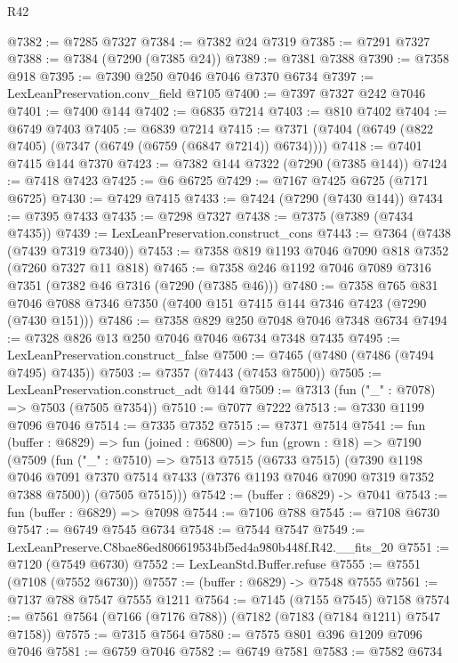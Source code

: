 \begin{lexlean}{R42}
\begin{coremodule}
{@7382 := @7285 @7327
@7384 := @7382 @24 @7319
@7385 := @7291 @7327
@7388 := @7384 (@7290 (@7385 @24))
@7389 := @7381 @7388
@7390 := @7358 @918
@7395 := @7390 @250 @7046 @7046 @7370 @6734
@7397 := LexLeanPreservation.conv_field @7105
@7400 := @7397 @7327 @242 @7046
@7401 := @7400 @144
@7402 := @6835 @7214
@7403 := @810 @7402
@7404 := @6749 @7403
@7405 := @6839 @7214
@7415 := @7371 (@7404 (@6749 (@822 @7405) (@7347 (@6749 (@6759 (@6847 @7214)) @6734))))
@7418 := @7401 @7415 @144 @7370
@7423 := @7382 @144 @7322 (@7290 (@7385 @144))
@7424 := @7418 @7423
@7425 := @6 @6725
@7429 := @7167 @7425 @6725 (@7171 @6725)
@7430 := @7429 @7415
@7433 := @7424 (@7290 (@7430 @144))
@7434 := @7395 @7433
@7435 := @7298 @7327
@7438 := @7375 (@7389 (@7434 @7435))
@7439 := LexLeanPreservation.construct_cons
@7443 := @7364 (@7438 (@7439 @7319 @7340))
@7453 := @7358 @819 @1193 @7046 @7090 @818 @7352 (@7260 @7327 @11 @818)
@7465 := @7358 @246 @1192 @7046 @7089 @7316 @7351 (@7382 @46 @7316 (@7290 (@7385 @46)))
@7480 := @7358
    @765
    @831
    @7046
    @7088
    @7346
    @7350
    (@7400 @151 @7415 @144 @7346 @7423 (@7290 (@7430 @151)))
@7486 := @7358 @829 @250 @7048 @7046 @7348 @6734
@7494 := @7328 @826 @13 @250 @7046 @7046 @6734 @7348 @7435
@7495 := LexLeanPreservation.construct_false
@7500 := @7465 (@7480 (@7486 (@7494 @7495) @7435))
@7503 := @7357 (@7443 (@7453 @7500))
@7505 := LexLeanPreservation.construct_adt @144
@7509 := @7313 (fun ("_" : @7078) => @7503 (@7505 @7354))
@7510 := @7077 @7222
@7513 := @7330 @1199 @7096 @7046
@7514 := @7335 @7352
@7515 := @7371 @7514
@7541 := fun (buffer : @6829) =>
  fun (joined : @6800) =>
  fun (grown : @18) =>
  @7190
    (@7509
      (fun ("_" : @7510) =>
      @7513
        @7515
        (@6733 @7515)
        (@7390
          @1198
          @7046
          @7091
          @7370
          @7514
          @7433
          (@7376 @1193 @7046 @7090 @7319 @7352 @7388 @7500))
        (@7505 @7515)))
@7542 := (buffer : @6829) -> @7041
@7543 := fun (buffer : @6829) => @7098
@7544 := @7106 @788
@7545 := @7108 @6730
@7547 := @6749 @7545 @6734
@7548 := @7544 @7547
@7549 := LexLeanPreserve.C8bae86ed806619534bf5ed4a980b448f.R42.__fits_20
@7551 := @7120 (@7549 @6730)
@7552 := LexLeanStd.Buffer.refuse
@7555 := @7551 (@7108 (@7552 @6730))
@7557 := (buffer : @6829) -> @7548 @7555
@7561 := @7137 @788 @7547 @7555 @1211
@7564 := @7145 (@7155 @7545) @7158
@7574 := @7561 @7564 (@7166 (@7176 @788)) (@7182 (@7183 (@7184 @1211) @7547 @7158))
@7575 := @7315 @7564
@7580 := @7575 @801 @396 @1209 @7096 @7046
@7581 := @6759 @7046
@7582 := @6749 @7581
@7583 := @7582 @6734
}
\end{coremodule}
\end{lexlean}
